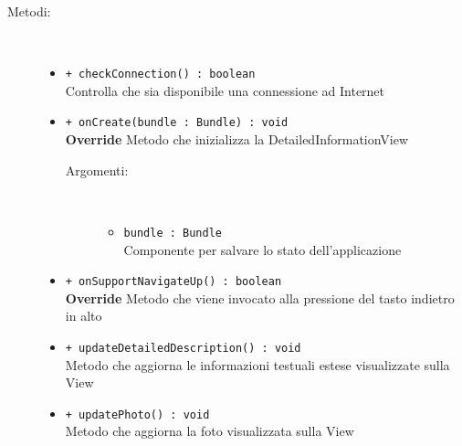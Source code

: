 \documentclass[../DefinizioneDiProdotto.tex]{subfiles}
\begin{document}
\begin{description}
\begin{itemize}
	\end{itemize}
	\item[Metodi:] \
	\begin{itemize}
		\item \texttt{+ checkConnection() : boolean}\\
		Controlla che sia disponibile una connessione ad Internet
		\item \texttt{+ onCreate(bundle : Bundle) : void}\\
		\textbf{Override} Metodo che inizializza la DetailedInformationView
		\begin{description}
			\item[Argomenti:] \
			\begin{itemize}
				\item \texttt{bundle : Bundle}\\
				Componente per salvare lo stato dell'applicazione\end{itemize}
		\end{description}
		\item \texttt{+ onSupportNavigateUp() : boolean}\\
		\textbf{Override} Metodo che viene invocato alla pressione del tasto indietro in alto
		\item \texttt{+ updateDetailedDescription() : void}\\
		Metodo che aggiorna le informazioni testuali estese visualizzate sulla View
		\item \texttt{+ updatePhoto() : void}\\
		Metodo che aggiorna la foto visualizzata sulla View
	\end{itemize}
\end{description}
\end{document}
